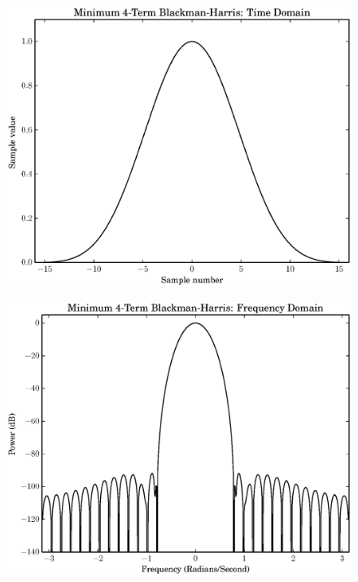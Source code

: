 \documentclass[letterpaper,12pt]{report}
\begin{document}
\begin{figure}
    \caption{\label{plot:opt_blackman}}
    \includegraphics[width=\textwidth]{plots/min4_blackman_td.eps}
\end{figure}

\begin{figure}
    \caption{}
    \includegraphics[width=\textwidth]{plots/min4_blackman_fd.eps}
\end{figure}
\end{document}
